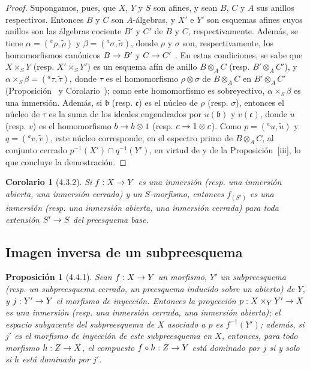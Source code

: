 \documentclass[oneside]{amsart}
\theoremstyle{ega-env-style}
\theoremstyle{ega-thm-env-style}
\newtheorem*{proposition}{Proposición}
\newtheorem*{corollary}{Corolario}
\theoremstyle{ega-defn-env-style}
\renewcommand{\to}{\mathchoice{\longrightarrow}{\rightarrow}{\rightarrow}{\rightarrow}}
\let\EGAOriginalLabel\label
\renewcommand{\label}[1]{\phantomsection\EGAOriginalLabel{#1}}
\begin{document}
\begin{proof}
Supongamos, pues, que $X$, $Y$ y $S$ son afines, y sean $B$, $C$ y $A$ sus anillos respectivos.
Entonces $B$ y $C$ son $A$-álgebras, y $X'$ e $Y'$ son esquemas afines cuyos anillos son las álgebras cociente $B'$ y $C'$ de $B$ y $C$, respectivamente.
Además, se tiene $\alpha=({}^a\rho,\widetilde{\rho})$ y $\beta=({}^a\sigma,\widetilde{\sigma})$, donde $\rho$ y $\sigma$ son, respectivamente, los homomorfismos canónicos $B\to B'$ y $C\to C'$ .
En estas condiciones, se sabe que $X\times_S Y$ (resp. $X'\times_S Y'$) es un esquema afín de anillo $B\otimes_A C$ (resp. $B'\otimes_A C'$), y $\alpha\times_S\beta=({}^a\tau,\widetilde{\tau})$, donde $\tau$ es el homomorfismo $\rho\otimes\sigma$ de $B\otimes_A C$ en $B'\otimes_A C'$ (Proposición~ y Corolario~);
como este homomorfismo es sobreyectivo, $\alpha\times_S\beta$ es una inmersión.
Además, si $\mathfrak{b}$ (resp. $\mathfrak{c}$) es el núcleo de $\rho$ (resp. $\sigma$), entonces el núcleo de $\tau$ es
la suma de los ideales engendrados por $u(\mathfrak{b})$ y $v(\mathfrak{c})$, donde $u$ (resp. $v$) es el homomorfismo $b\to b\otimes1$ (resp. $c\to1\otimes c$).
Como $p=({}^a u,\widetilde{u})$ y $q=({}^a v,\widetilde{v})$, este núcleo corresponde, en el espectro primo de $B\otimes_A C$, al conjunto cerrado $p^{-1}(X')\cap q^{-1}(Y')$, en virtud de  y de la Proposición~[iii], lo que concluye la demostración.
\end{proof}

\begin{corollary}[4.3.2]
\label{I.4.3.2}
Si $f:X\to Y$ es una inmersión (\textup{resp.} una inmersión abierta, una inmersión cerrada) y un $S$-morfismo, entonces $f_{(S')}$ es una inmersión (\textup{resp.} una inmersión abierta, una inmersión cerrada) para toda extensión $S'\to S$ del preesquema base.
\end{corollary}

\subsection{Imagen inversa de un subpreesquema}
\label{subsection:I.4.4}

\begin{proposition}[4.4.1]
\label{I.4.4.1}
Sean $f:X\to Y$ un morfismo, $Y'$ un subpreesquema (\textup{resp.} un subpreesquema cerrado, un preesquema inducido sobre un abierto) de $Y$, y $j:Y'\to Y$ el morfismo de inyección.
Entonces la proyección $p:X\times_Y Y'\to X$ es una inmersión (\textup{resp.} una inmersión cerrada, una inmersión abierta);
el espacio subyacente del subpreesquema de $X$ asociado a $p$ es $f^{-1}(Y')$;
además, si $j'$ es el morfismo de inyección de este subpreesquema en $X$, entonces, para todo morfismo $h:Z\to X$, el compuesto $f\circ h:Z\to Y$ está dominado por $j$ si y solo si $h$ está dominado por $j'$.
\end{proposition}
\end{document}
